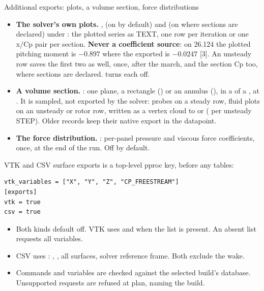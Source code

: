 \begin{frame}{Additional exports: plots, a volume section, force distributions}
\begin{itemize}\small
  \item \textbf{The solver's own plots.} ,
         (on by default) and  (on
        where sections are declared) under \code{[exports]}: the plotted series
        as TEXT, one row per iteration or one x/Cp pair per section.
        \textbf{Never a coefficient source}: on 26.124 the plotted pitching
        moment is $-0.897$ where the exported  is $-0.0247$ [3].
        An unsteady row saves the first two as well, once,
        after the march, and the section Cp too, where
        sections are declared.
         turns each off.
  \item \textbf{A volume section.} : one plane, a
        rectangle () or an annulus (), in a
         of a , at . \alert{It
        is sampled, not exported by the solver}: probes on a steady
        row, fluid plots on an unsteady or rotor row, written as
        a vertex cloud to  or
         ( per unsteady STEP). Older records
        keep their native export in the datapoint.
  \item \textbf{The force distribution.} : per-panel pressure and viscous force coefficients, once, at the
        end of the run. Off by default.
\end{itemize}
\end{frame}

\begin{frame}[fragile]{VTK and CSV surface exports}
\small {} is a top-level pproc key, before any tables:
\begin{lstlisting}[style=ftsbase]
vtk_variables = ["X", "Y", "Z", "CP_FREESTREAM"]
[exports]
vtk = true
csv = true
\end{lstlisting}
\begin{itemize}\small
  \item Both kinds default off. VTK uses 
        and  when the list is present.
        An absent list requests all variables.
  \item CSV uses : ,
        , all surfaces, solver reference frame. Both exclude the wake.
  \item Commands and variables are checked against the selected build's database.
        Unsupported requests are refused at plan, naming the build.
\end{itemize}
\end{frame}

